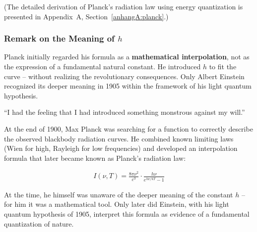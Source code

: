 (The detailed derivation of Planck’s radiation law using energy quantization is presented in Appendix~A, Section~\ref{anhangA:planck}.)

\subsubsection{Remark on the Meaning of \( h \)}

Planck initially regarded his formula as a \textbf{mathematical interpolation}, not as the expression of a fundamental natural constant. He introduced \( h \) to fit the curve – without realizing the revolutionary consequences. Only Albert Einstein recognized its deeper meaning in 1905 within the framework of his light quantum hypothesis.

\vspace{-0.3em}
\begin{tcolorbox}[physikbox,title={Max Planck – Scientific Autobiography \cite{Planck1948}}]
	\label{box:planck-zitat}
	“I had the feeling that I had introduced something monstrous against my will.”
\end{tcolorbox}

\vspace{1em}
\begin{tcolorbox}[mathebox, title={Planck’s Radiation Law: A Mathematical Interpolation \cite{Hoffmann2008}}]
	\label{box:planck-interpolation}
	At the end of 1900, Max Planck was searching for a function to correctly describe the observed blackbody radiation curves. He combined known limiting laws (Wien for high, Rayleigh for low frequencies) and developed an interpolation formula that later became known as Planck’s radiation law:
	
	\begin{align}
		I(\nu, T) = \frac{8\pi \nu^2}{c^3} \cdot \frac{h\nu}{e^{h\nu/kT} - 1}
	\end{align}
	
	At the time, he himself was unaware of the deeper meaning of the constant \( h \) – for him it was a mathematical tool. Only later did Einstein, with his light quantum hypothesis of 1905, interpret this formula as evidence of a fundamental quantization of nature.
\end{tcolorbox}
\newpage
\noindent
